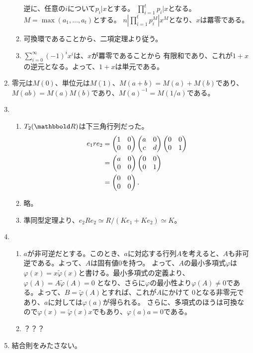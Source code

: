 \documentclass[9pt]{ltjsarticle}
\begin{document}
\begin{enumerate}[label=(問題\arabic*)]
\begin{enumerate}[label=(\arabic*)]
    逆に、任意の$i$について$p_i | x$とする。
    $\prod_{i=1}^t p_i | x$となる。
    $M = \max(a_1,\dots,a_t)$とする。
    $n | \prod_{i=1}^t p_i^M | x^M$となり、$x$は羃零である。
    \item 可換環であることから、二項定理より従う。
    \item $\sum_{i=0}^\infty (-1)^i x^i$は、$x$が羃零であることから
    有限和であり、これが$1+x$の逆元となる。よって、$1+x$は単元である。
  \end{enumerate}
  \item 零元は$M(0)$、単位元は$M(1)$、$M(a+b) = M(a)+M(b)$であり、
  $M(ab) = M(a)M(b)$であり、$M(a)^{-1} = M(1/a)$である。
  \item
  \begin{enumerate}[label=(\arabic*)]
    \item $T_2(\R)$は下三角行列だった。
    \begin{align}
      e_1 r e_2
      &=
      \left(\begin{matrix} 1 & 0 \\ 0 & 0 \end{matrix}\right) \left(\begin{matrix} a & 0 \\ c & d \end{matrix}\right) \left(\begin{matrix} 0 & 0 \\ 0 & 1 \end{matrix}\right)\\
      &=
      \left(\begin{matrix} a & 0 \\ 0 & 0 \end{matrix}\right) \left(\begin{matrix} 0 & 0 \\ 0 & 1 \end{matrix}\right)\\
      &=
      \left(\begin{matrix} 0 & 0 \\ 0 & 0 \end{matrix}\right).
    \end{align}
    \item 略。
    \item 準同型定理より、$e_2 R e_2 \simeq R/(Ke_1 + Ke_2)\simeq K$。
  \end{enumerate}
  \item
  \begin{enumerate}[label=(\arabic*)]
    \item $a$が非可逆だとする。このとき、$a$に対応する行列$A$を考えると、$A$も非可逆である。よって、$A$は固有値0を持つ。
    よって、$A$の最小多項式$\varphi$は$\varphi(x) = x \tilde \varphi(x)$と書ける。最小多項式の定義より、$\varphi(A) = A \tilde \varphi(A)  = 0$
    となり、さらに$\varphi$の最小性より$\varphi(A)\neq 0$である。よって、$B=\tilde \varphi(A)$とすれば、これが$A$にかけて
    0となる非零元であり、$a$に対しては$\varphi(a)$が得られる。
    さらに、多項式のほうは可換なので$\varphi(x) = \tilde \varphi(x)x$でもあり、$\varphi(a)a = 0$である。
    \item ？？？
  \end{enumerate}
  \item 結合則をみたさない。
  \end{enumerate}
\end{document}
